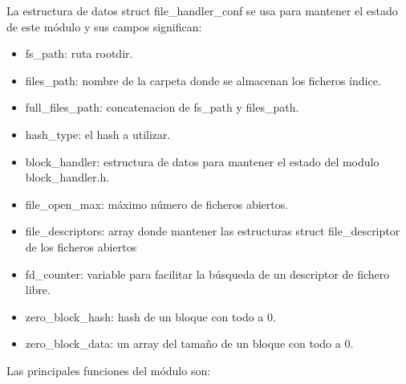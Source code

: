 \documentclass[a4paper,12pt]{article}
\begin{document}
La estructura de datos struct file\_handler\_conf se usa para mantener el estado de este módulo y sus campos significan:

\begin{itemize}
\item fs\_path: ruta rootdir.
\item files\_path: nombre de la carpeta donde se almacenan los ficheros índice.
\item full\_files\_path: concatenacion de fs\_path y files\_path.
\item hash\_type: el hash a utilizar.
\item block\_handler: estructura de datos para mantener el estado del modulo block\_handler.h.
\item file\_open\_max: máximo número de ficheros abiertos.
\item file\_descriptors: array donde mantener las estructuras struct file\_descriptor de los ficheros abiertos
\item fd\_counter: variable para facilitar la búsqueda de un descriptor de fichero libre.
\item zero\_block\_hash: hash de un bloque con todo a 0.
\item zero\_block\_data: un array del tamaño de un bloque con todo a 0.
\end{itemize}

Las principales funciones del módulo son:
\end{document}
